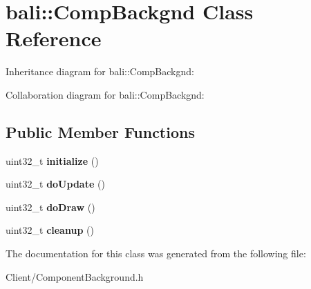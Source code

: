 \hypertarget{classbali_1_1_comp_backgnd}{\section{bali\-:\-:Comp\-Backgnd Class Reference}
\label{classbali_1_1_comp_backgnd}
}


Inheritance diagram for bali\-:\-:Comp\-Backgnd\-:


Collaboration diagram for bali\-:\-:Comp\-Backgnd\-:
\subsection*{Public Member Functions}
\begin{DoxyCompactItemize}
\item 
\hypertarget{classbali_1_1_comp_backgnd_a813c4a3b9c535f36e96f2edbacc65dc8}{uint32\-\_\-t {\bfseries initialize} ()}\label{classbali_1_1_comp_backgnd_a813c4a3b9c535f36e96f2edbacc65dc8}

\item 
\hypertarget{classbali_1_1_comp_backgnd_abc8aec269bea06cc573dc94bab940fa0}{uint32\-\_\-t {\bfseries do\-Update} ()}\label{classbali_1_1_comp_backgnd_abc8aec269bea06cc573dc94bab940fa0}

\item 
\hypertarget{classbali_1_1_comp_backgnd_a27b57fdae5c278295586465b4e4d7267}{uint32\-\_\-t {\bfseries do\-Draw} ()}\label{classbali_1_1_comp_backgnd_a27b57fdae5c278295586465b4e4d7267}

\item 
\hypertarget{classbali_1_1_comp_backgnd_a675a227dab3b2269b29b45212685c8e5}{uint32\-\_\-t {\bfseries cleanup} ()}\label{classbali_1_1_comp_backgnd_a675a227dab3b2269b29b45212685c8e5}

\end{DoxyCompactItemize}


The documentation for this class was generated from the following file\-:\begin{DoxyCompactItemize}
\item 
Client/Component\-Background.\-h\end{DoxyCompactItemize}
